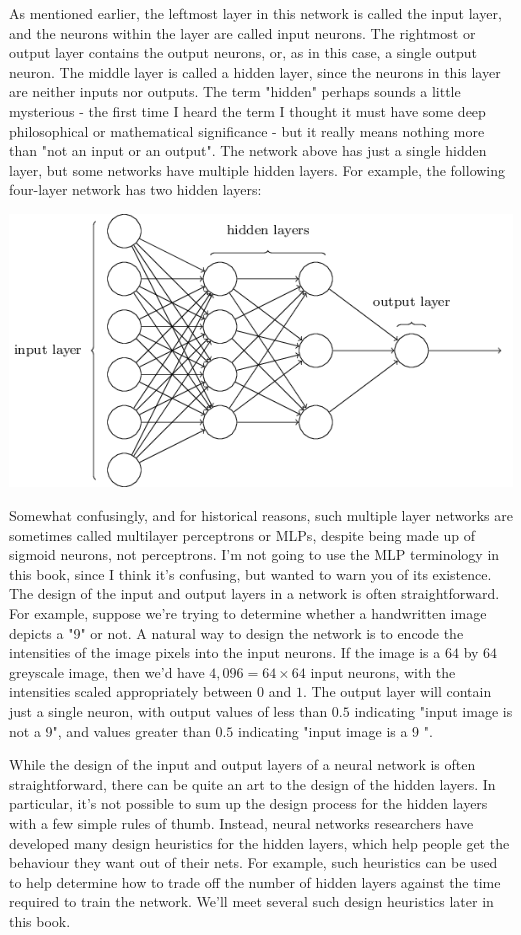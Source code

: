 \documentclass[a4paper,12pt]{report}%
\begin{document}
As mentioned earlier, the leftmost layer in this network is called the input layer, and the neurons within the layer are called input neurons. The rightmost or output layer contains the output neurons, or, as in this case, a single output neuron. The middle layer is called a hidden layer, since the neurons in this layer are neither inputs nor outputs. The term "hidden" perhaps sounds a little mysterious - the first time I heard the term I thought it must have some deep philosophical or mathematical significance - but it really means nothing more than "not an input or an output". The network above has just a single hidden layer, but some networks have multiple hidden layers. For example, the following four-layer network has two hidden layers:
\begin{center}
 \includegraphics[width=0.8\linewidth]{images/tikz11.png}
\end{center}

Somewhat confusingly, and for historical reasons, such multiple layer networks are sometimes called multilayer perceptrons or MLPs, despite being made up of sigmoid neurons, not perceptrons. I'm not going to use the MLP terminology in this book, since I think it's confusing, but wanted to warn you of its existence.
The design of the input and output layers in a network is often straightforward. For example, suppose we're trying to determine whether a handwritten image depicts a "9" or not. A natural way to design the network is to encode the intensities of the image pixels into the input neurons. If the image is a $64$ by $64$ greyscale image, then we'd have $4,096=64\times64$ input neurons, with the intensities scaled appropriately between $0$ and $1$. The output layer will contain just a single neuron, with output values of less than $0.5$ indicating "input image is not a 9", and values greater than $0.5$ indicating "input image is a 9 ".

While the design of the input and output layers of a neural network is often straightforward, there can be quite an art to the design of the hidden layers. In particular, it's not possible to sum up the design process for the hidden layers with a few simple rules of thumb. Instead, neural networks researchers have developed many design heuristics for the hidden layers, which help people get the behaviour they want out of their nets. For example, such heuristics can be used to help determine how to trade off the number of hidden layers against the time required to train the network. We'll meet several such design heuristics later in this book.
\end{document}
